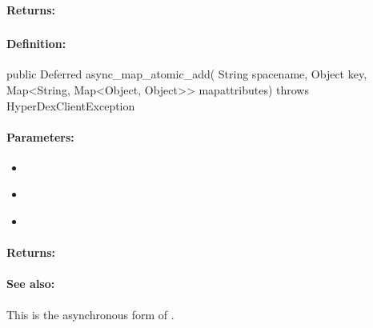 \paragraph{Returns:}


\pagebreak
\subsubsection{}
\label{api:java:async_map_atomic_add}


\paragraph{Definition:}
\begin{javacode}
public Deferred async_map_atomic_add(
        String spacename,
        Object key,
        Map<String, Map<Object, Object>> mapattributes) throws HyperDexClientException
\end{javacode}

\paragraph{Parameters:}
\begin{itemize}[noitemsep]
\item {}\\

\item {}\\

\item {}\\

\end{itemize}

\paragraph{Returns:}


\paragraph{See also:}  This is the asynchronous form of .

